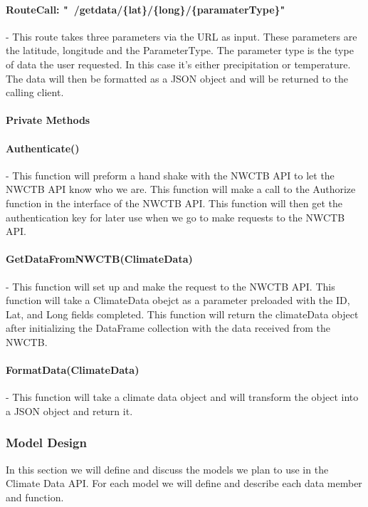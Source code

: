 \documentclass[onecolumn, draftclsnofoot,10pt, compsoc]{article}
\begin{document}
					\paragraph{RouteCall: "~/getdata/\{lat\}/\{long\}/\{paramaterType\}"} - This route takes three parameters via the URL as input. These parameters are the latitude, longitude and the ParameterType. The parameter type is the type of data the user requested. In this case it's either precipitation or temperature. The data will then be formatted as a JSON object and will be returned to the calling client.\\

					\paragraph{\textbf{Private Methods}}

					\paragraph{Authenticate()} - This function will preform a hand shake with the NWCTB API to let the NWCTB API know who we are. This function will make a call to the Authorize function in the interface of the NWCTB API. This function will then get the authentication key for later use when we go to make requests to the NWCTB API.\\
					\paragraph{GetDataFromNWCTB(ClimateData)} - This function will set up and make the request to the NWCTB API. This function will take a ClimateData obejct as a parameter preloaded with the ID, Lat, and Long fields completed. This function will return the climateData object after initializing the DataFrame collection with the data received from the NWCTB.\\
					\paragraph{FormatData(ClimateData)} - This function will take a climate data object and will transform the object into a JSON object and return it.\\

				\subsubsection{Model Design}
					In this section we will define and discuss the models we plan to use in the Climate Data API. For each model we will define and describe each data member and function.\\
\end{document}
